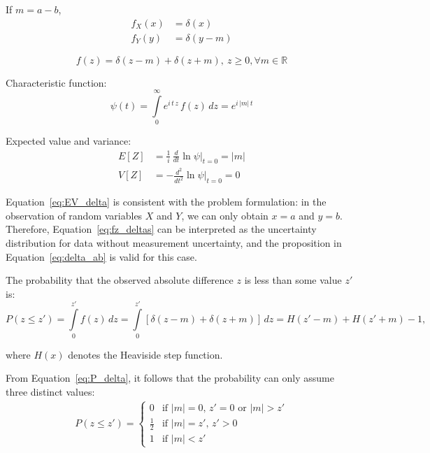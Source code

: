 \documentclass[12pt,a4paper]{article}
\theoremstyle{definition}
\begin{document}
If $m = a - b$,
\begin{equation}
	\begin{aligned}
		f_X(x) &= \delta(x) \\
		f_Y(y) &= \delta(y-m)
	\end{aligned}
	\label{eq:delta_m}
\end{equation}

\begin{equation}
	f(z) = \delta(z-m) + \delta(z+m),~ z \geq 0, \forall m \in \mathbb{R} 
	\label{eq:fz_deltas}
\end{equation}

Characteristic function:
\begin{equation}
	\psi(t) = \int\limits_{0}^{\infty} e^{i\,t\,z}\,f(z)\,dz = e^{i\,|m|\,t}
	\label{eq:charf_deltas}
\end{equation}

Expected value and variance:
\begin{equation}
	\begin{aligned}
		E\left[Z\right] &= \frac{1}{i}\,\frac{d}{dt} \ln{\psi} \bigg|_{t=0} = \left\vert m \right\vert\\
		V\left[Z\right] &= -\frac{d^2}{dt^2} \ln{\psi} \bigg|_{t=0} = 0
		\label{eq:EV_delta}
	\end{aligned}
\end{equation}

Equation~\ref{eq:EV_delta} is consistent with the problem formulation: in the observation of random variables $X$ and $Y$, we can only obtain $x=a$ and $y=b$. Therefore, Equation~\ref{eq:fz_deltas} can be interpreted as the uncertainty distribution for data without measurement uncertainty, and the proposition in Equation~\ref{eq:delta_ab} is valid for this case.

The probability that the observed absolute difference $z$ is less than some value $z'$ is:
\begin{equation}
	P(z \leq z') = \int\limits_{0}^{z'} f(z)\,dz = \int\limits_{0}^{z'} \left[\delta(z-m) + \delta(z+m)\right]\,dz = H(z'-m) + H(z'+m) - 1,
\end{equation}

where $H(x)$ denotes the Heaviside step function.

From Equation~\ref{eq:P_delta}, it follows that the probability can only assume three distinct values:
\begin{equation}
	\begin{aligned}
		P(z \leq z') = 
		\begin{cases}
			0 & \text{if } |m| = 0,\, z' = 0 \text{ or } |m| > z'\\
			\frac{1}{2} & \text{if } |m| = z',\, z' > 0\\
			1 & \text{if } |m| < z'
		\end{cases}
	\end{aligned}
	\label{eq:P_delta}
\end{equation}
\end{document}
